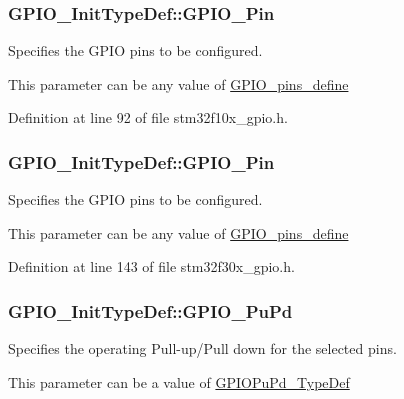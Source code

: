 \hypertarget{struct_g_p_i_o___init_type_def_a0beb7bf54bbf5fff56f49d8beba2e3df}{
\subsubsection[{G\-P\-I\-O\-\_\-\-Pin}]{ G\-P\-I\-O\-\_\-\-Init\-Type\-Def\-::\-G\-P\-I\-O\-\_\-\-Pin}}\label{struct_g_p_i_o___init_type_def_a0beb7bf54bbf5fff56f49d8beba2e3df}
\begin{DoxyVerb}             Specifies the GPIO pins to be configured.
\end{DoxyVerb}
 This parameter can be any value of \hyperlink{group___g_p_i_o__pins__define}{G\-P\-I\-O\-\_\-pins\-\_\-define} 

Definition at line 92 of file stm32f10x\-\_\-gpio.\-h.

\hypertarget{struct_g_p_i_o___init_type_def_a0beb7bf54bbf5fff56f49d8beba2e3df}{
\subsubsection[{G\-P\-I\-O\-\_\-\-Pin}]{ G\-P\-I\-O\-\_\-\-Init\-Type\-Def\-::\-G\-P\-I\-O\-\_\-\-Pin}}\label{struct_g_p_i_o___init_type_def_a0beb7bf54bbf5fff56f49d8beba2e3df}
\begin{DoxyVerb}              Specifies the GPIO pins to be configured.
\end{DoxyVerb}
 This parameter can be any value of \hyperlink{group___g_p_i_o__pins__define}{G\-P\-I\-O\-\_\-pins\-\_\-define} 

Definition at line 143 of file stm32f30x\-\_\-gpio.\-h.

\hypertarget{struct_g_p_i_o___init_type_def_aad62942c003bc2083d37f10f6f39bd5f}{
\subsubsection[{G\-P\-I\-O\-\_\-\-Pu\-Pd}]{ G\-P\-I\-O\-\_\-\-Init\-Type\-Def\-::\-G\-P\-I\-O\-\_\-\-Pu\-Pd}}\label{struct_g_p_i_o___init_type_def_aad62942c003bc2083d37f10f6f39bd5f}
\begin{DoxyVerb}     Specifies the operating Pull-up/Pull down for the selected pins.
\end{DoxyVerb}
 This parameter can be a value of \hyperlink{stm32f4xx__gpio_8h_afb7ecd99c44b4fd702d669304a36c2c8}{G\-P\-I\-O\-Pu\-Pd\-\_\-\-Type\-Def} 

